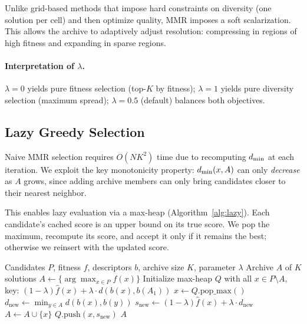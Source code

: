 Unlike grid-based methods that impose hard constraints on diversity (one solution per cell) and then optimize quality, MMR imposes a soft scalarization.
This allows the archive to adaptively adjust resolution: compressing in regions of high fitness and expanding in sparse regions.

\paragraph{Interpretation of $\lambda$.}
$\lambda = 0$ yields pure fitness selection (top-$K$ by fitness); $\lambda = 1$ yields pure diversity selection (maximum spread); $\lambda = 0.5$ (default) balances both objectives.

\subsection{Lazy Greedy Selection}
\label{sec:lazy}

Naive MMR selection requires $O(NK^2)$ time due to recomputing $d_{\min}$ at each iteration.
We exploit the key monotonicity property: $d_{\min}(x, A)$ can only \emph{decrease} as $A$ grows, since adding archive members can only bring candidates closer to their nearest neighbor.

This enables lazy evaluation via a max-heap (Algorithm~\ref{alg:lazy}).
Each candidate's cached score is an upper bound on its true score.
We pop the maximum, recompute its score, and accept it only if it remains the best; otherwise we reinsert with the updated score.

\begin{algorithm}[t]
\caption{Lazy Greedy MMR Selection}
\label{alg:lazy}
\begin{algorithmic}[1]
\REQUIRE Candidates $P$, fitness $f$, descriptors $b$, archive size $K$, parameter $\lambda$
\ENSURE Archive $A$ of $K$ solutions
\STATE $A \gets \{\arg\max_{x \in P} f(x)\}$  
\STATE Initialize max-heap $Q$ with all $x \in P \setminus A$, key: $(1-\lambda)\hat{f}(x) + \lambda \cdot d(b(x), b(A_1))$
    \STATE $x \gets Q.\text{pop\_max}()$
    \STATE $d_{\text{new}} \gets \min_{y \in A} d(b(x), b(y))$ 
    \STATE $s_{\text{new}} \gets (1-\lambda)\hat{f}(x) + \lambda \cdot d_{\text{new}}$
        \STATE $A \gets A \cup \{x\}$ 
    \ELSE
        \STATE $Q.\text{push}(x, s_{\text{new}})$ 
    \ENDIF
\ENDWHILE
\RETURN $A$
\end{algorithmic}
\end{algorithm}

